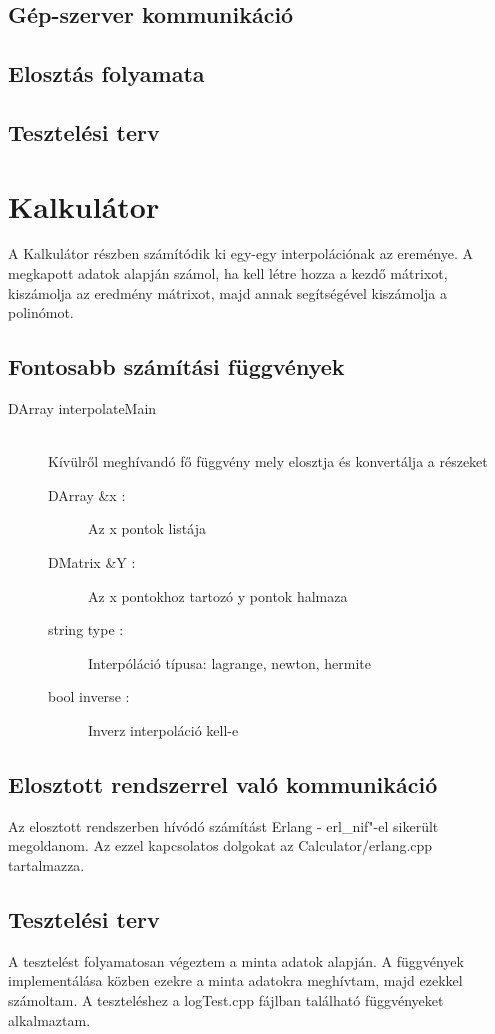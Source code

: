 \documentclass{elteikthesis}
\begin{document}
\subsection{Gép-szerver kommunikáció}
\subsection{Elosztás folyamata}
\subsection{Tesztelési terv}

\section{Kalkulátor}
A Kalkulátor részben számítódik ki egy-egy interpolációnak az ereménye.
A megkapott adatok alapján számol, ha kell létre hozza a kezdő mátrixot, kiszámolja az eredmény mátrixot, majd annak segítségével kiszámolja a polinómot.
\subsection{Fontosabb számítási függvények}

\begin{description}
	\item[DArray interpolateMain] 
	\hfill \\ Kívülről meghívandó fő függvény mely elosztja és konvertálja a részeket
	\begin{description}
	  \item[DArray \&x :] Az x pontok listája 
	  \item[DMatrix \&Y :] Az x pontokhoz tartozó y pontok halmaza
	  \item[string type :] Interpóláció típusa: lagrange, newton, hermite
	  \item[bool inverse :] Inverz interpoláció kell-e
	\end{description}
\end{description}
\subsection{Elosztott rendszerrel való kommunikáció}
Az elosztott rendszerben hívódó számítást Erlang - erl\_nif"-el sikerült megoldanom. 
Az ezzel kapcsolatos dolgokat az Calculator/erlang.cpp tartalmazza. 
\subsection{Tesztelési terv}
A tesztelést folyamatosan végeztem a minta adatok alapján. A függvények implementálása közben ezekre a minta adatokra meghívtam, majd ezekkel számoltam. A teszteléshez a logTest.cpp fájlban található függvényeket alkalmaztam. 
\end{document}
